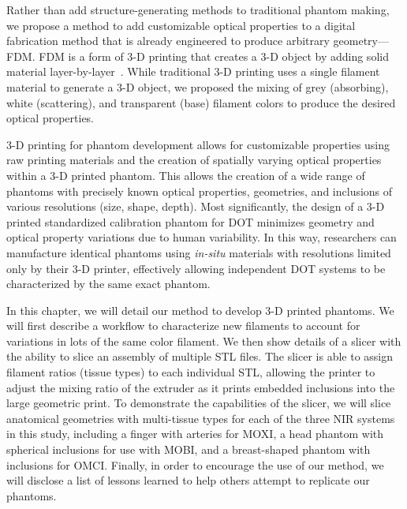 Rather than add structure-generating methods to traditional phantom making, we propose a method to add customizable optical properties to a digital fabrication method that is already engineered to produce arbitrary geometry---\ac{FDM}. \ac{FDM} is a form of 3-D printing that creates a 3-D object by adding solid material layer-by-layer~\cite{Dong2015}. While traditional 3-D printing uses a single filament material to generate a 3-D object, we proposed the mixing of grey (absorbing), white (scattering), and transparent (base) filament colors to produce the desired optical properties. 

3-D printing for phantom development allows for customizable properties using raw printing materials and the creation of spatially varying optical properties within a 3-D printed phantom. This allows the creation of a wide range of phantoms with precisely known optical properties, geometries, and inclusions of various resolutions (size, shape, depth). Most significantly, the design of a 3-D printed standardized calibration phantom for DOT minimizes geometry and optical property variations due to human variability. In this way, researchers can manufacture identical phantoms using \textit{in-situ} materials with resolutions limited only by their 3-D printer, effectively allowing independent DOT systems to be characterized by the same exact phantom. 

In this chapter, we will detail our method to develop 3-D printed phantoms. We will first describe a workflow to characterize new filaments to account for variations in lots of the same color filament. We then show details of a slicer with the ability to slice an assembly of multiple STL files. The slicer is able to assign filament ratios (tissue types) to each individual STL, allowing the printer to adjust the mixing ratio of the extruder as it prints embedded inclusions into the large geometric print. To demonstrate the capabilities of the slicer, we will slice anatomical geometries with multi-tissue types for each of the three \ac{NIR} systems in this study, including a finger with arteries for \ac{MOXI}, a head phantom with spherical inclusions for use with \ac{MOBI}, and a breast-shaped phantom with inclusions for \ac{OMCI}. Finally, in order to encourage the use of our method, we will disclose a list of lessons learned to help others attempt to replicate our phantoms. 



